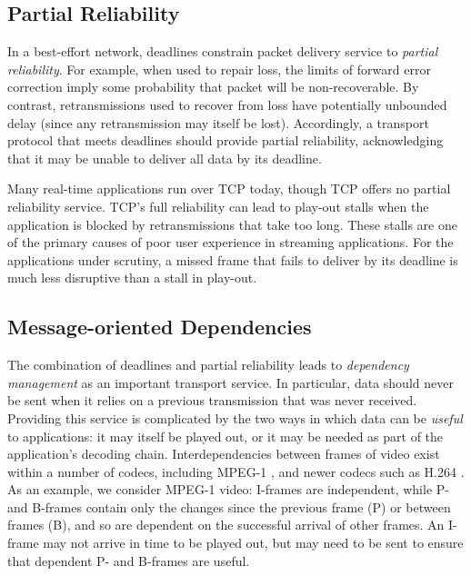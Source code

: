 \documentclass[10pt]{sig-alternate-05-2015}
\begin{document}
\subsection{Partial Reliability}
In a best-effort network, deadlines
constrain packet delivery service to \emph{partial reliability}.
For example, when used to repair loss, the limits of forward error correction
imply some probability that packet will be non-recoverable. By contrast,
retransmissions used to recover from loss have potentially unbounded delay
(since any retransmission may itself be lost).
Accordingly, a transport protocol that meets deadlines should provide partial
reliability, acknowledging that it may be unable to deliver all data by its
deadline.

Many real-time applications run over TCP today, though TCP offers no partial
reliability service. TCP's full reliability can lead to play-out stalls
when the application is blocked by retransmissions that take too
long. These stalls are one of the primary causes of poor user experience in
streaming applications.
For the applications under scrutiny, a missed frame that fails to deliver by its
deadline is much less disruptive than a stall in play-out.

\subsection{Message-oriented Dependencies}

The combination of deadlines and partial reliability leads to \emph{dependency
management} as an important transport service.
In particular, data should never be sent when it relies on a previous
transmission that was never received. Providing this service is complicated by
the two ways in which data can be \emph{useful} to applications: it may itself
be played out, or it may be needed as part of the application's decoding chain.
Interdependencies between frames of video exist within a number of codecs,
including MPEG-1 \cite{le1991mpeg}, and newer codecs such as H.264
\cite{wiegand2003overview}. As an example, we consider MPEG-1 video:
I-frames are independent, while P- and B-frames contain only the changes 
since the previous frame (P) or between frames (B), and so are dependent on
the successful arrival of other frames. An I-frame may not arrive in time
to be played out, but may need to be sent to ensure that dependent P- and
B-frames are useful. 
\end{document}
